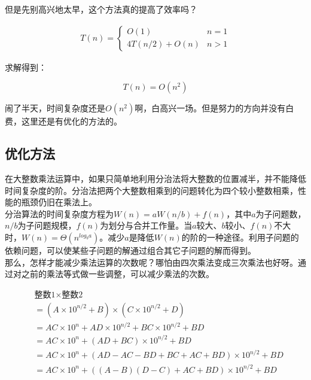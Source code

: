 但是先别高兴地太早，这个方法真的提高了效率吗？

\vspace{-0.5cm}

\begin{align*}
    T(n) = \begin{cases}
        O(1)           & n = 1 \\
        4T(n/2) + O(n) & n > 1
    \end{cases}
\end{align*}

求解得到：

\vspace{-0.5cm}

$$
    T(n) = O(n^2)
$$

闹了半天，时间复杂度还是$ O(n^2) $啊，白高兴一场。但是努力的方向并没有白费，这里还是有优化的方法的。 \\

\subsection{优化方法}

在大整数乘法运算中，如果只简单地利用分治法将大整数的位置减半，并不能降低时间复杂度的阶。分治法把两个大整数相乘到的问题转化为四个较小整数相乘，性能的瓶颈仍旧在乘法上。 \\

分治算法的时间复杂度方程为$ W(n) = aW(n/b) + f(n) $，其中$ a $为子问题数，$ n / b $为子问题规模，$ f(n) $为划分与合并工作量。当$ a $较大、$ b $较小、$ f(n) $不大时，$ W(n) = \Theta(n^{log_ba}) $。减少$ a $是降低$ W(n) $的阶的一种途径。利用子问题的依赖问题，可以使某些子问题的解通过组合其它子问题的解而得到。 \\

那么，怎样才能减少乘法运算的次数呢？哪怕由四次乘法变成三次乘法也好呀。通过对之前的乘法等式做一些调整，可以减少乘法的次数。

\vspace{-1cm}

\begin{align*}
     & \text{整数1} \times \text{整数2}                                      \\
     & = (A \times 10^{n/2} + B) \times (C \times 10^{n/2} + D)              \\
     & = AC \times 10^n + AD \times 10^{n/2} + BC \times 10^{n/2} + BD       \\
     & = AC \times 10^n + (AD + BC) \times 10^{n/2} + BD                     \\
     & = AC \times 10^n + (AD - AC - BD + BC + AC + BD) \times 10^{n/2} + BD \\
     & = AC \times 10^n + ((A - B)(D - C) + AC + BD) \times 10^{n/2} + BD
\end{align*}

